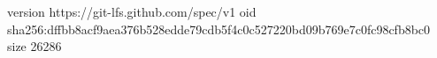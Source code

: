 version https://git-lfs.github.com/spec/v1
oid sha256:dffbb8acf9aea376b528edde79cdb5f4c0c527220bd09b769e7c0fc98cfb8bc0
size 26286
